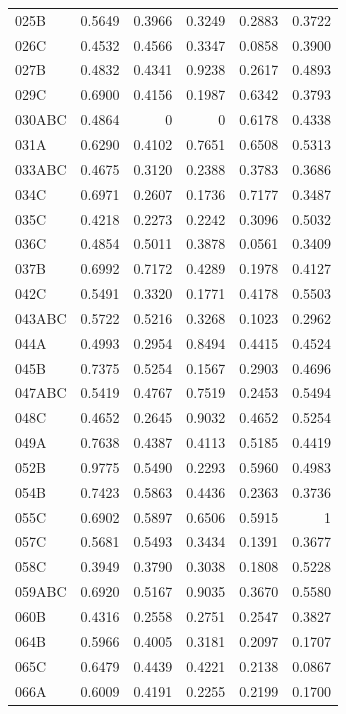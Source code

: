 \begin{longtable}{lrrrrr}
  025B & 0.5649 & 0.3966 & 0.3249 & 0.2883 & 0.3722 \\
  026C & 0.4532 & 0.4566 & 0.3347 & 0.0858 & 0.3900 \\
  027B & 0.4832 & 0.4341 & 0.9238 & 0.2617 & 0.4893 \\
  029C & 0.6900 & 0.4156 & 0.1987 & 0.6342 & 0.3793 \\
  030ABC & 0.4864 & 0 & 0 & 0.6178 & 0.4338 \\
  031A & 0.6290 & 0.4102 & 0.7651 & 0.6508 & 0.5313 \\
  033ABC & 0.4675 & 0.3120 & 0.2388 & 0.3783 & 0.3686 \\
  034C & 0.6971 & 0.2607 & 0.1736 & 0.7177 & 0.3487 \\
  035C & 0.4218 & 0.2273 & 0.2242 & 0.3096 & 0.5032 \\
  036C & 0.4854 & 0.5011 & 0.3878 & 0.0561 & 0.3409 \\
  037B & 0.6992 & 0.7172 & 0.4289 & 0.1978 & 0.4127 \\
  042C & 0.5491 & 0.3320 & 0.1771 & 0.4178 & 0.5503 \\
  043ABC & 0.5722 & 0.5216 & 0.3268 & 0.1023 & 0.2962 \\
  044A & 0.4993 & 0.2954 & 0.8494 & 0.4415 & 0.4524 \\
  045B & 0.7375 & 0.5254 & 0.1567 & 0.2903 & 0.4696 \\
  047ABC & 0.5419 & 0.4767 & 0.7519 & 0.2453 & 0.5494 \\
  048C & 0.4652 & 0.2645 & 0.9032 & 0.4652 & 0.5254 \\
  049A & 0.7638 & 0.4387 & 0.4113 & 0.5185 & 0.4419 \\
  052B & 0.9775 & 0.5490 & 0.2293 & 0.5960 & 0.4983 \\
  054B & 0.7423 & 0.5863 & 0.4436 & 0.2363 & 0.3736 \\
  055C & 0.6902 & 0.5897 & 0.6506 & 0.5915 & 1 \\
  057C & 0.5681 & 0.5493 & 0.3434 & 0.1391 & 0.3677 \\
  058C & 0.3949 & 0.3790 & 0.3038 & 0.1808 & 0.5228 \\
  059ABC & 0.6920 & 0.5167 & 0.9035 & 0.3670 & 0.5580 \\
  060B & 0.4316 & 0.2558 & 0.2751 & 0.2547 & 0.3827 \\
  064B & 0.5966 & 0.4005 & 0.3181 & 0.2097 & 0.1707 \\
  065C & 0.6479 & 0.4439 & 0.4221 & 0.2138 & 0.0867 \\
  066A & 0.6009 & 0.4191 & 0.2255 & 0.2199 & 0.1700 \\

\end{longtable}
